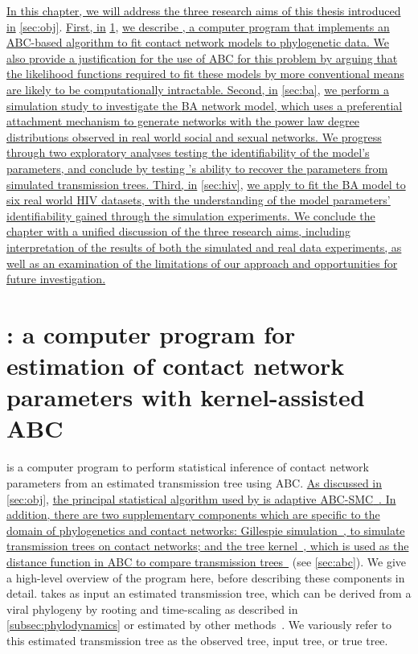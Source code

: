 

{\color{blue}\uline{ In this chapter, we will address the three research aims
of this thesis introduced in} \cref{sec:obj}. \uline{First, in}
\cref{sec:netabc}, \uline{we describe , a computer program
that implements an \acrlong{ABC}-based algorithm to fit contact network models
to phylogenetic data. We also provide a justification for the use of \gls{ABC}
for this problem by arguing that the likelihood functions required to fit these
models by more conventional means are likely to be computationally intractable.
Second, in} \cref{sec:ba}, \uline{we perform a simulation study to investigate
the \acrlong{BA} network model, which uses a preferential attachment mechanism
to generate networks with the power law degree distributions observed in real
world social and sexual networks. We progress through two exploratory analyses
testing the identifiability of the model's parameters, and conclude by testing
's ability to recover the parameters from simulated
transmission trees. Third, in} \cref{sec:hiv}, \uline{we apply
 to fit the \gls{BA} model to six real world \gls{HIV}
datasets, with the understanding of the model parameters' identifiability
gained through the simulation experiments. We conclude the chapter with a
unified discussion of the three research aims, including interpretation of the
results of both the simulated and real data experiments, as well as an
examination of the limitations of our approach and opportunities for future
investigation.}}

\section{: a computer program for estimation of contact
network parameters with kernel-assisted ABC}
\label{sec:netabc}

 is a computer program to perform statistical inference of
contact network parameters from an estimated transmission tree using
\gls{ABC}. {\color{blue}\uline{As discussed in }\cref{sec:obj}, \uline{the principal
statistical algorithm used by  is adaptive
\gls{ABC}-\gls{SMC}~\autocite{del2012adaptive}. In addition, there are two
supplementary components which are specific to the domain of phylogenetics and
contact networks: Gillespie simulation~\autocite{gillespie1976general}, to
simulate transmission trees on contact networks; and the tree
kernel~\autocite{poon2013mapping}, which is used as the distance function in
\gls{ABC} to compare transmission trees~\autocite{poon2015phylodynamic}} (see
\cref{sec:abc}).} We give a high-level overview of the program here, before
describing these components in detail.  takes as input an
estimated transmission tree, which can be derived from a viral phylogeny by
rooting and time-scaling as described in \cref{subsec:phylodynamics} or
estimated by other methods~\autocite{cottam2008integrating,
jombart2011reconstructing, ypma2012unravelling, morelli2012bayesian,
didelot2014bayesian, hall2015epidemic}. We variously refer to this estimated
transmission tree as the observed tree, input tree, or true tree.

